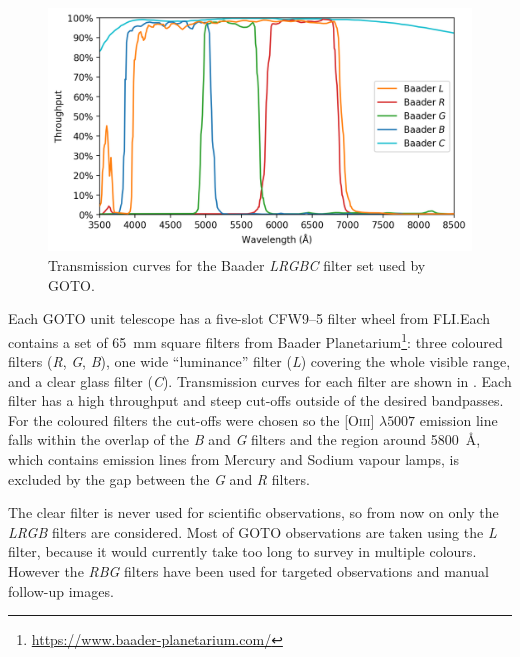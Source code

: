 \begin{colsection}
\begin{colsection}
\begin{figure}[t]
    \begin{center}
        \includegraphics[width=\textwidth]{images/throughput/trans_filters.png}
    \end{center}
    \caption[Baader filter transmission curves]{
        Transmission curves for the Baader \textit{LRGBC} filter set used by GOTO.\
    }\label{fig:filters}
\end{figure}

Each GOTO unit telescope has a five-slot CFW9--5 filter wheel from FLI.\@ Each contains a set of \SI{65}{\milli\metre} square filters from Baader Planetarium\footnote{\url{https://www.baader-planetarium.com/}}: three coloured filters (\textit{R}, \textit{G}, \textit{B}), one wide ``luminance'' filter (\textit{L}) covering the whole visible range, and a clear glass filter ({\textit{C}}). Transmission curves for each filter are shown in . Each filter has a high throughput and steep cut-offs outside of the desired bandpasses. For the coloured filters the cut-offs were chosen so the [O\textsc{iii}] $\lambda 5007$ emission line falls within the overlap of the \textit{B} and \textit{G} filters and the region around \SI{5800}{\angstrom}, which contains emission lines from Mercury and Sodium vapour lamps, is excluded by the gap between the \textit{G} and \textit{R} filters.

The clear filter is never used for scientific observations, so from now on only the \textit{LRGB} filters are considered. Most of GOTO observations are taken using the \textit{L} filter, because it would currently take too long to survey in multiple colours. However the \textit{RBG} filters have been used for targeted observations and manual follow-up images.


\end{colsection}
\end{colsection}
